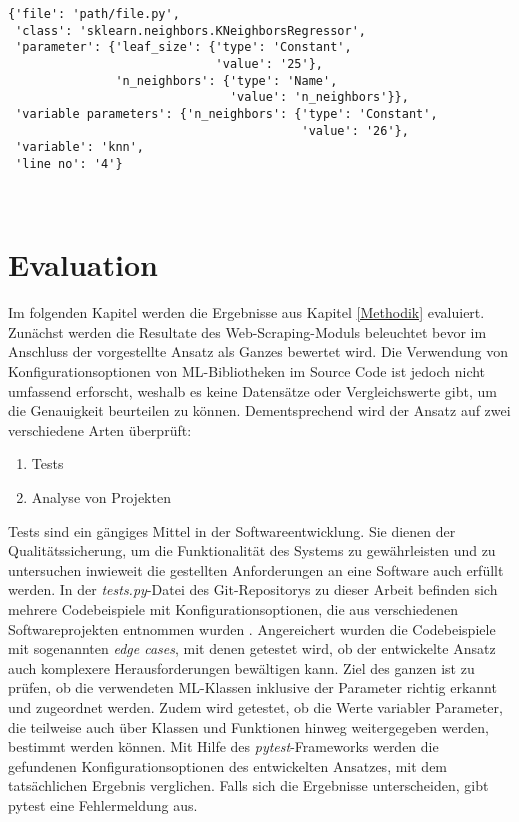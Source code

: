 \documentclass[german,bachelor]{swsLeipzig}
\begin{document}
\noindent\begin{minipage}{\linewidth}
\begin{lstlisting}[frame=single, label=final_dict, basicstyle=\small, caption={Dictionary-Eintrag der KNeighborsRegressor-Klasse mit möglichen Parameterwerten},captionpos=b]
{'file': 'path/file.py',
 'class': 'sklearn.neighbors.KNeighborsRegressor',
 'parameter': {'leaf_size': {'type': 'Constant',
                             'value': '25'},
               'n_neighbors': {'type': 'Name',
                               'value': 'n_neighbors'}},
 'variable parameters': {'n_neighbors': {'type': 'Constant',
                                         'value': '26'},
 'variable': 'knn',
 'line no': '4'}
\end{lstlisting}
\end{minipage}
\


\chapter{Evaluation}\label{Evaluation}
Im folgenden Kapitel werden die Ergebnisse aus Kapitel \ref{Methodik} evaluiert.
Zunächst werden die Resultate des Web-Scraping-Moduls beleuchtet bevor im Anschluss der vorgestellte Ansatz
als Ganzes bewertet wird.
Die Verwendung von Konfigurationsoptionen von ML-Bibliotheken im Source Code ist jedoch nicht umfassend erforscht,
weshalb es keine Datensätze oder Vergleichswerte gibt, um die Genauigkeit beurteilen zu können.
Dementsprechend wird der Ansatz auf zwei verschiedene Arten überprüft:
\begin{enumerate}
 \item Tests
 \item Analyse von Projekten
\end{enumerate}

Tests sind ein gängiges Mittel in der Softwareentwicklung.
Sie dienen der Qualitätssicherung, um die Funktionalität des Systems zu gewährleisten und zu untersuchen inwieweit
die gestellten Anforderungen an eine Software auch erfüllt werden.
In der \textit{tests.py}-Datei des Git-Repositorys zu dieser Arbeit befinden sich mehrere Codebeispiele mit Konfigurationsoptionen, die aus
verschiedenen Softwareprojekten entnommen wurden \cite[]{marco}.
Angereichert wurden die Codebeispiele mit sogenannten \textit{edge cases}, mit denen getestet wird, ob der entwickelte
Ansatz auch komplexere Herausforderungen bewältigen kann.
Ziel des ganzen ist zu prüfen, ob die verwendeten ML-Klassen inklusive der Parameter richtig erkannt und zugeordnet werden.
Zudem wird getestet, ob die Werte variabler Parameter, die teilweise auch über Klassen und Funktionen hinweg weitergegeben werden,
bestimmt werden können.
Mit Hilfe des \textit{pytest}-Frameworks werden die gefundenen Konfigurationsoptionen des entwickelten Ansatzes,
mit dem tatsächlichen Ergebnis verglichen.
Falls sich die Ergebnisse unterscheiden, gibt pytest eine Fehlermeldung aus.\\
\end{document}
